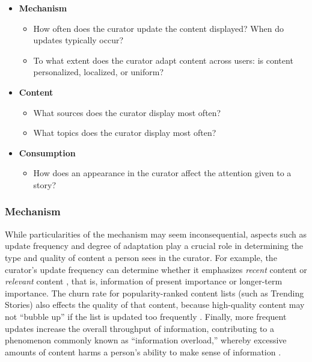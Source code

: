 \begin{itemize}
\item \textbf{Mechanism}
\begin{itemize}
\item How often does the curator update the content displayed? When do updates typically occur?
\item To what extent does the curator adapt content across users: is content personalized, localized, or uniform?
\end{itemize}

\item \textbf{Content}
\begin{itemize}
\item What sources does the curator display most often?
\item What topics does the curator display most often?
\end{itemize}

\item \textbf{Consumption}
\begin{itemize}
\item How does an appearance in the curator affect the attention given to a story?

\end{itemize}
\end{itemize}

\subsubsection{Mechanism}
While particularities of the mechanism may seem inconsequential, aspects such as update frequency and degree of adaptation play a crucial role in determining the type and quality of content a person sees in the curator. For example, the curator's update frequency can determine whether it emphasizes \textit{recent} content or \textit{relevant} content \citep{Chakraborty2015}, that is, information of present importance or longer-term importance. The churn rate for popularity-ranked content lists (such as Trending Stories) also effects the quality of that content, because high-quality content may not ``bubble up'' if the list is updated too frequently \citep{Salganik,Chaney2019,Ciampaglia2018}. Finally, more frequent updates increase the overall throughput of information, contributing to a phenomenon commonly known as ``information overload,'' whereby excessive amounts of content harms a person's ability to make sense of information \citep{Himma,Bawden2009}.

